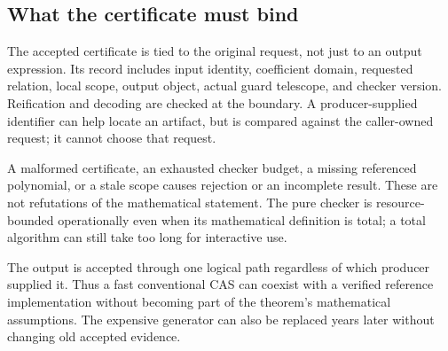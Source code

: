 \documentclass[11pt,a4paper]{article}
\theoremstyle{remark}\newtheorem{example}[proposition]{Example}
\begin{document}
\subsection{What the certificate must bind}
The accepted certificate is tied to the original request, not just to an output expression. Its record includes input identity, coefficient domain, requested relation, local scope, output object, actual guard telescope, and checker version. Reification and decoding are checked at the boundary. A producer-supplied identifier can help locate an artifact, but is compared against the caller-owned request; it cannot choose that request.

A malformed certificate, an exhausted checker budget, a missing referenced polynomial, or a stale scope causes rejection or an incomplete result. These are not refutations of the mathematical statement. The pure checker is resource-bounded operationally even when its mathematical definition is total; a total algorithm can still take too long for interactive use.

The output is accepted through one logical path regardless of which producer supplied it. Thus a fast conventional CAS can coexist with a verified reference implementation without becoming part of the theorem's mathematical assumptions. The expensive generator can also be replaced years later without changing old accepted evidence.
\end{document}
